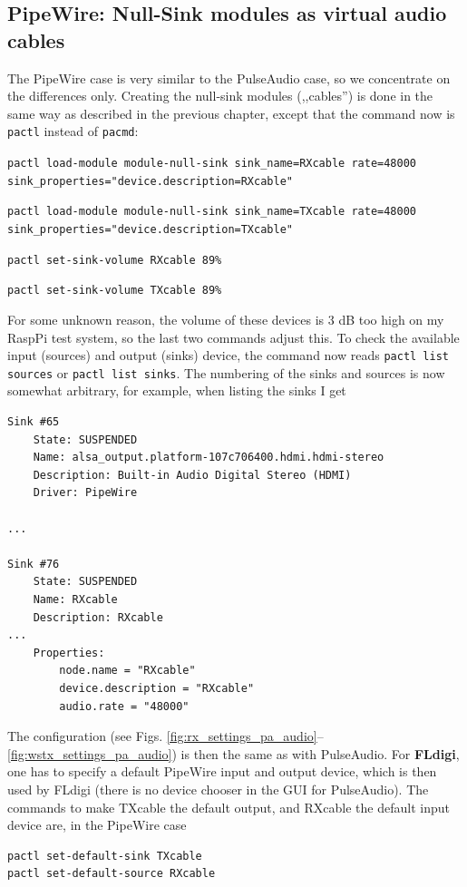 \documentclass[12pt]{book}
\begin{document}
\subsection[PipeWire: NullSink modules]{PipeWire: Null-Sink modules as virtual audio cables}
The PipeWire case is very similar to the PulseAudio case, so we concentrate
on the differences only. Creating the null-sink modules (,,cables'') is
done in the same way as described in the previous chapter, except that
the command now is \texttt{pactl} instead of \texttt{pacmd}:

\texttt{pactl load-module module-null-sink sink\_name=RXcable rate=48000 \\
sink\_properties="device.description=RXcable"
}

\texttt{pactl load-module module-null-sink sink\_name=TXcable rate=48000 \\
sink\_properties="device.description=TXcable"
}

\texttt{pactl set-sink-volume RXcable 89\%}

\texttt{pactl set-sink-volume TXcable 89\%}

For some unknown reason, the volume of these devices is 3 dB too high on my
RaspPi test system, so the last two commands adjust this.
To check the available input (sources) and output (sinks) device, the command
now reads \texttt{pactl list sources} or \texttt{pactl list sinks}. The numbering
of the sinks and sources is now somewhat arbitrary, for example, when listing the
sinks I get
\begin{verbatim}
Sink #65
	State: SUSPENDED
	Name: alsa_output.platform-107c706400.hdmi.hdmi-stereo
	Description: Built-in Audio Digital Stereo (HDMI)
	Driver: PipeWire

...

Sink #76
	State: SUSPENDED
	Name: RXcable
	Description: RXcable
...
	Properties:
		node.name = "RXcable"
		device.description = "RXcable"
		audio.rate = "48000"
\end{verbatim}
The configuration (see Figs. \ref{fig:rx_settings_pa_audio}--\ref{fig:wstx_settings_pa_audio}) is then the same
as with PulseAudio. For {\color{red} \textbf{FLdigi}}, one has to specify a default PipeWire input and output device, which is
then used by FLdigi (there is no device chooser in the GUI for PulseAudio). The commands to make TXcable the default output, and RXcable the default
input device are, in the PipeWire case

\begin{verbatim}
pactl set-default-sink TXcable
pactl set-default-source RXcable
\end{verbatim}
\end{document}
